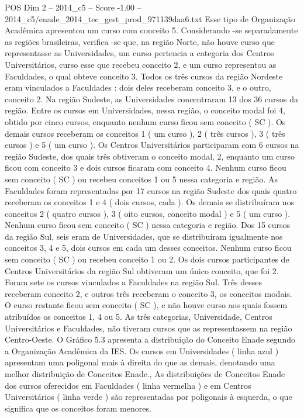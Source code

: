 \begin{textsample}{POS Dim 2 – 2014\_c5 – Score -1.00 – 2014\_c5/enade\_2014\_tec\_gest\_prod\_971139daa6.txt}
Esse tipo de Organização Acadêmica apresentou um curso com conceito 5.
Considerando -se separadamente as regiões brasileiras, verifica -se que, na região Norte, não houve curso que representasse as Universidades, um curso pertencia a categoria dos Centros Universitários, curso esse que recebeu conceito 2, e um curso representou as Faculdades, o qual obteve conceito 3.
Todos os três cursos da região Nordeste eram vinculados a Faculdades : dois deles receberam conceito 3, e o outro, conceito 2.
Na região Sudeste, as Universidades concentraram 13 dos 36 cursos da região.
Entre os cursos em Universidades, nessa região, o conceito modal foi 4, obtido por cinco cursos, enquanto nenhum curso ficou sem conceito ( SC ).
Os demais cursos receberam os conceitos 1 ( um curso ), 2 ( três cursos ), 3 ( três cursos ) e 5 ( um curso ).
Os Centros Universitários participaram com 6 cursos na região Sudeste, dos quais três obtiveram o conceito modal, 2, enquanto um curso ficou com conceito 3 e dois cursos ficaram com conceito 4.
Nenhum curso ficou sem conceito ( SC ) ou recebeu conceitos 1 ou 5 nessa categoria e região.
As Faculdades foram representadas por 17 cursos na região Sudeste dos quais quatro receberam os conceitos 1 e 4 ( dois cursos, cada ).
Os demais se distribuíram nos conceitos 2 ( quatro cursos ), 3 ( oito cursos, conceito modal ) e 5 ( um curso ).
Nenhum curso ficou sem conceito ( SC ) nessa categoria e região.
Dos 15 cursos da região Sul, seis eram de Universidades, que se distribuíram igualmente nos conceitos 3, 4 e 5, dois cursos em cada um desses conceitos.
Nenhum curso ficou sem conceito ( SC ) ou recebeu conceito 1 ou 2.
Os dois cursos participantes de Centros Universitários da região Sul obtiveram um único conceito, que foi 2.
Foram sete os cursos vinculados a Faculdades na região Sul.
Três desses receberam conceito 2, e outros três receberam o conceito 3, os conceitos modais.
O curso restante ficou sem conceito ( SC ), e não houve curso aos quais fossem atribuídos os conceitos 1, 4 ou 5.
As três categorias, Universidade, Centros Universitários e Faculdades, não tiveram cursos que as representassem na região Centro-Oeste.
O Gráfico 5.3 apresenta a distribuição do Conceito Enade segundo a Organização Acadêmica da IES.
Os cursos em Universidades ( linha azul ) apresentam uma poligonal mais à direita do que as demais, denotando uma melhor distribuição de Conceitos Enade., As distribuições de Conceitos Enade dos cursos oferecidos em Faculdades ( linha vermelha ) e em Centros Universitários ( linha verde ) são representadas por poligonais à esquerda, o que significa que os conceitos foram menores.

\end{textsample}
